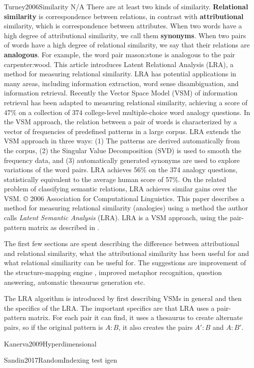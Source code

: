 \documentclass[10pt]{article}
\begin{document}
\begin{review}
        {Turney2006Similarity}
        {N/A}
        {
        There are at least two kinds of similarity. 
        \textbf{Relational similarity} is correspondence between relations, in contrast with \textbf{attributional} similarity, which is correspondence between attributes.
        When two words have a high degree of attributional similarity, we call them \textbf{synonyms}. 
        When two pairs of words have a high degree of relational similarity, we say that their relations are \textbf{analogous}. 
        For example, the word pair mason:stone is analogous to the pair carpenter:wood. 
        This article introduces Latent Relational Analysis (LRA), a method for measuring relational similarity. LRA has potential applications in many areas, including information extraction, word sense disambiguation, and information retrieval. 
        Recently the Vector Space Model (VSM) of information retrieval has been adapted to measuring relational similarity, achieving a score of 47\% on a collection of 374 college-level multiple-choice word analogy questions. 
        In the VSM approach, the relation between a pair of words is characterized by a vector of frequencies of predefined patterns in a large corpus. 
        LRA extends the VSM approach in three ways: (1) The patterns are derived automatically from the corpus, (2) the Singular Value Decomposition (SVD) is used to smooth the frequency data, and (3) automatically generated synonyms are used to explore variations of the word pairs. 
        LRA achieves 56\% on the 374 analogy questions, statistically equivalent to the average human score of 57\%. 
        On the related problem of classifying semantic relations, LRA achieves similar gains over the VSM. 
        © 2006 Association for Computational Linguistics.
        }
    This paper describes a method for measuring relational similarity (analogies) using a method the author calls \emph{Latent Semantic Analysis} (LRA).
    LRA is a VSM approach, using the pair-pattern matrix as described in \cite{Turney2010VsmOverview}.
    
    The first few sections are spent describing the difference between attributional and relational similarity, what the attributional similarity has been useful for and what relational similiarity can be useful for.
    The suggestions are improvement of the structure-mapping engine \cite{Gentner1983Structure}, improved metaphor recognition, question answering, automatic thesaurus generation etc.
    
    The LRA algorithm is introduced by first describing VSMs in general and then the specifics of the LRA.
    The important specifics are that LRA uses a pair-pattern matrix.
    For each pair it can find, it uses a thesaurus to create alternate pairs, so if the original pattern is $A : B$, it also creates the pairs $A' : B$ and $A : B'$.\cite{Kanerva2009Hyperdimensional}
\end{review}

\begin{review}{Kanerva2009Hyperdimensional}{}{}

\end{review}

\begin{review}{Sandin2017RandomIndexing}
    test igen
\end{review}

\listofreview

\newpage
\printbibliography
\end{document}
